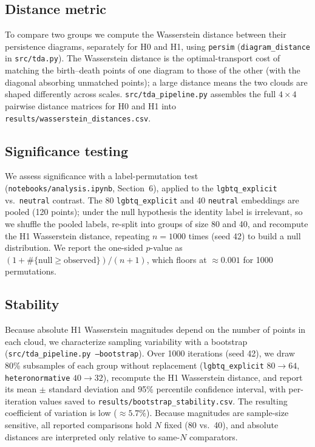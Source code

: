\documentclass[11pt]{article}
\begin{document}
\subsection{Distance metric}

To compare two groups we compute the Wasserstein distance between their persistence diagrams, separately for H0 and H1, using \texttt{persim} (\texttt{diagram\_distance} in \texttt{src/tda.py}). The Wasserstein distance is the optimal-transport cost of matching the birth--death points of one diagram to those of the other (with the diagonal absorbing unmatched points); a large distance means the two clouds are shaped differently across scales. \texttt{src/tda\_pipeline.py} assembles the full $4 \times 4$ pairwise distance matrices for H0 and H1 into \texttt{results/wasserstein\_distances.csv}.

\subsection{Significance testing}

We assess significance with a label-permutation test (\texttt{notebooks/analysis.ipynb}, Section~6), applied to the \texttt{lgbtq\_explicit} vs.\ \texttt{neutral} contrast. The 80 \texttt{lgbtq\_explicit} and 40 \texttt{neutral} embeddings are pooled (120 points); under the null hypothesis the identity label is irrelevant, so we shuffle the pooled labels, re-split into groups of size 80 and 40, and recompute the H1 Wasserstein distance, repeating $n = 1000$ times (seed 42) to build a null distribution. We report the one-sided $p$-value as $(1 + \#\{\text{null} \geq \text{observed}\}) / (n + 1)$, which floors at $\approx 0.001$ for 1000 permutations.

\subsection{Stability}

Because absolute H1 Wasserstein magnitudes depend on the number of points in each cloud, we characterize sampling variability with a bootstrap (\texttt{src/tda\_pipeline.py --bootstrap}). Over 1000 iterations (seed 42), we draw 80\% subsamples of each group without replacement (\texttt{lgbtq\_explicit} $80 \rightarrow 64$, \texttt{heteronormative} $40 \rightarrow 32$), recompute the H1 Wasserstein distance, and report its mean $\pm$ standard deviation and 95\% percentile confidence interval, with per-iteration values saved to \texttt{results/bootstrap\_stability.csv}. The resulting coefficient of variation is low ($\approx 5.7\%$). Because magnitudes are sample-size sensitive, all reported comparisons hold $N$ fixed (80 vs.\ 40), and absolute distances are interpreted only relative to same-$N$ comparators.
\end{document}
